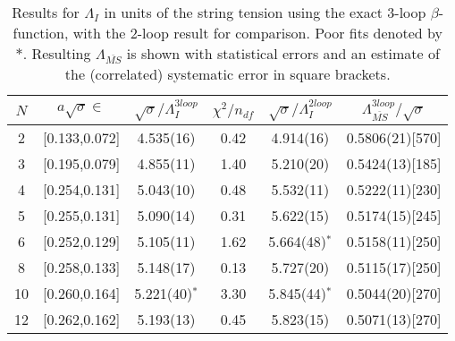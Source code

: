 \documentclass[12pt]{article}
\begin{document}



\begin{table}
\begin{center}
\begin{tabular}{|c|ccc|c|c|}\hline
  $N$ & $a\sqrt{\sigma}\in$ & $\sqrt{\sigma}/\Lambda^{3loop}_I$ & $\chi^2/n_{df}$
  & $\sqrt{\sigma}/\Lambda^{2loop}_I$ & $\Lambda^{3loop}_{\overline{MS}}/\sqrt{\sigma}$ \\ \hline  
2  & [0.133,0.072] & 4.535(16)  & 0.42 & 4.914(16) &  0.5806(21)[570]  \\
3  & [0.195,0.079] & 4.855(11)  & 1.40 & 5.210(20) &  0.5424(13)[185]  \\ 
4  & [0.254,0.131] & 5.043(10)  & 0.48 & 5.532(11) &  0.5222(11)[230]  \\ 
5  & [0.255,0.131] & 5.090(14)  & 0.31 & 5.622(15) &  0.5174(15)[245]  \\ 
6  & [0.252,0.129] & 5.105(11)  & 1.62 & 5.664(48)$^{\ast}$ & 0.5158(11)[250]   \\ 
8  & [0.258,0.133] & 5.148(17)  & 0.13 & 5.727(20) &  0.5115(17)[250]  \\ 
10 & [0.260,0.164] & 5.221(40)$^{\ast}$  & 3.30  & 5.845(44)$^{\ast}$ & 0.5044(20)[270]   \\ 
12 & [0.262,0.162] & 5.193(13)  & 0.45 & 5.823(15) &  0.5071(13)[270]  \\ \hline 
\end{tabular}
\caption{Results for $\Lambda_I$ in units of the string tension using the exact 3-loop
  $\beta$-function, with the 2-loop result for comparison. Poor fits denoted by $\ast$.
  Resulting $\Lambda_{\overline{MS}}$ is shown with statistical errors and an estimate
  of the (correlated) systematic error in square brackets.}
\label{table_Lambda_fitN}
\end{center}
\end{table}
\end{document}
